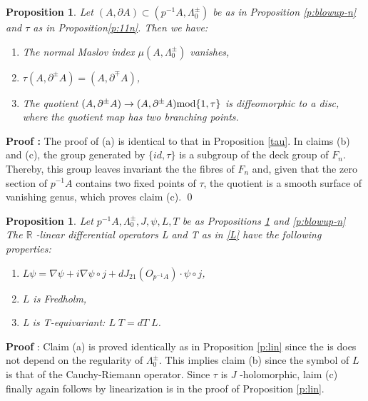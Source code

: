 \documentclass{amsart}
\newtheorem{proposition}[theorem]{Proposition}
\begin{document}
\begin{proposition} \label{taun}
Let $(A, \partial A) \subset (p^{-1}A,\Lambda_0^\pm)$ be as in Proposition \ref{p:blowup-n} and $\tau$ as in Proposition\ref{p:11n}.  Then we have:
\begin{enumerate}
\item[(a)] The normal Maslov index $\mu(A, \Lambda_0^\pm)$ vanishes,
\item[(b)] $\tau(A,\partial^\pm A)=(A, \partial^\mp A)$, 
\item[(c)] The quotient $(A,\partial^\pm A)\to (A,\partial^\pm A) {\rm mod}{\{1,\tau}\}$ is diffeomorphic to a disc, where  the quotient map has two branching points.
\end{enumerate}
\end{proposition}
\noindent
{\bf Proof :} The proof of (a) is identical to that in Proposition \ref{tau}. In claims (b) and (c), the group generated by $\{ id, \tau\}$ is a subgroup of the deck group of $F_n$. Thereby, this group leaves invariant the the fibres of $F_n$ and, given that the zero section of $p^{-1}A$ contains two fixed points of $\tau$, the quotient is a smooth surface of vanishing genus, which proves claim (c).
\qed
\begin{proposition} \label{p:linn} Let $p^{-1}A,\Lambda_0^\pm, J, \psi, L,T$ be as Propositions \ref{taun} and \ref{p:blowup-n}
The ${\mathbb{R}}$ -linear differential operators L and T as in \eqref{L} have the following properties:
\begin{enumerate}\item[(a)]     $L\psi=\nabla\psi+i
\nabla\psi\circ j + dJ_{21}(O_{p^{-1}A})\cdot \psi \circ j$,
\item[(b)] $L$ is Fredholm,
\item[(c)] L is T-equivariant: $ L\; T =dT\; L$. \end{enumerate} 
\end{proposition}
\noindent
 {\bf Proof} : Claim (a) is proved identically as in Proposition \ref{p:lin} since the is does not depend on the regularity of $\Lambda_0^{\pm}.$ This implies claim (b) since the symbol of $L$ is that of the Cauchy-Riemann operator. Since  
 $\tau$ is $J$ -holomorphic,
 laim (c) finally again follows by linearization is in the proof of  Proposition \ref{p:lin}.
\end{document}
